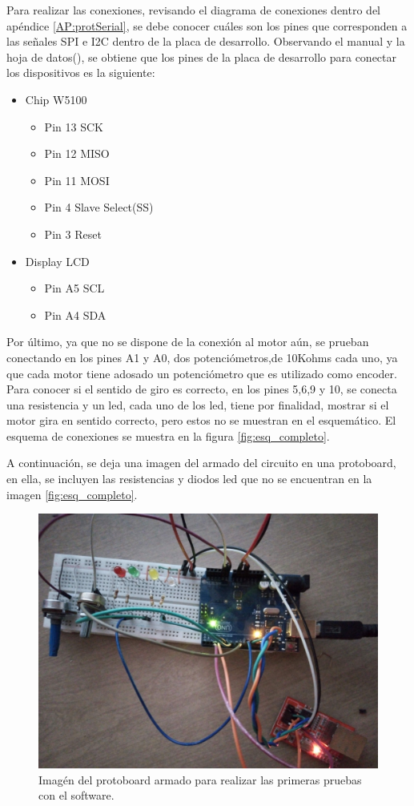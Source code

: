   
Para realizar las conexiones, revisando el diagrama de conexiones dentro del apéndice \ref{AP:protSerial}, se debe conocer cuáles son los pines que corresponden a las señales SPI e I2C dentro de la placa de desarrollo. Observando el manual y la hoja de datos(\cite{arduno}), se obtiene que los pines de la placa de desarrollo para conectar los dispositivos es la siguiente: 
\begin{itemize}
	\item Chip W5100 
	\begin{itemize}
		\item Pin 13  SCK 
		\item Pin 12  MISO 
		\item Pin 11  MOSI 
		\item Pin 4   Slave Select(SS)
		\item Pin 3   Reset 	
	\end{itemize}
	\item Display LCD   
	\begin{itemize} 
		\item Pin A5  SCL
		\item Pin A4  SDA
	\end{itemize}  
\end{itemize}  

Por último, ya que no se dispone de la conexión al motor aún, se prueban conectando en los pines A1 y A0, dos potenciómetros,de 10Kohms cada uno, ya que cada motor tiene adosado un potenciómetro que es utilizado como encoder. Para conocer si el sentido de giro es correcto, en los pines 5,6,9 y 10, se conecta una resistencia y un led, cada uno de los led, tiene por finalidad, mostrar si el motor gira en sentido correcto, pero estos no se muestran en el esquemático. El esquema de conexiones se muestra en la figura \ref{fig:esq_completo}.  

A continuación, se deja una imagen del armado del circuito en una protoboard, en ella, se incluyen las resistencias y diodos led que no se encuentran en la imagen \ref{fig:esq_completo}. 

\begin{figure}[H]
	\centering
	\includegraphics[scale=0.08]{protoboard_1}
	\caption{Imagén del protoboard armado para realizar las primeras pruebas con el software.}
	\label{fig:proto_1}
\end{figure}

